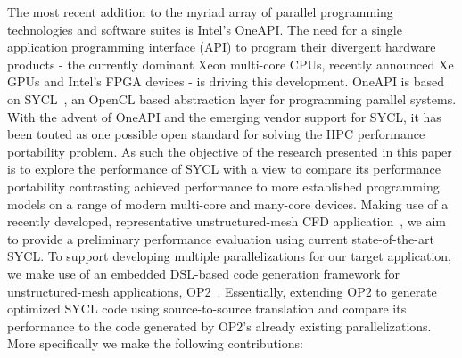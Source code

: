 \documentclass[runningheads]{llncs}
\begin{document}
The most recent addition to the myriad array of parallel programming 
technologies and software suites is Intel's OneAPI. The need for a single 
application programming interface (API) to program their divergent hardware 
products - the currently dominant Xeon multi-core CPUs, recently announced Xe 
GPUs and Intel's FPGA devices - is driving this development. OneAPI is based on 
SYCL~\cite{SYCL2019}, an OpenCL based abstraction layer for programming parallel 
systems. With the advent of OneAPI and the emerging vendor support for SYCL, it 
has been touted as one possible open standard for solving the HPC performance 
portability problem. As such the objective of the research presented in this 
paper is to explore the performance of SYCL with a view to compare its 
performance portability contrasting achieved performance to more established 
programming models on a range of modern multi-core and many-core devices. Making 
use of a recently developed, representative unstructured-mesh CFD 
application~\cite{Owenson2019}, we aim to provide a preliminary performance 
evaluation using current state-of-the-art SYCL. To support developing multiple 
parallelizations for our target application, we make use of an embedded DSL-based 
code generation framework for unstructured-mesh applications, 
OP2~\cite{InPar2012}. Essentially, extending OP2 to generate optimized SYCL code 
using source-to-source translation and compare its performance to the code 
generated by OP2's already existing parallelizations. More specifically we make 
the following contributions:\vspace{-5pt}
\end{document}
